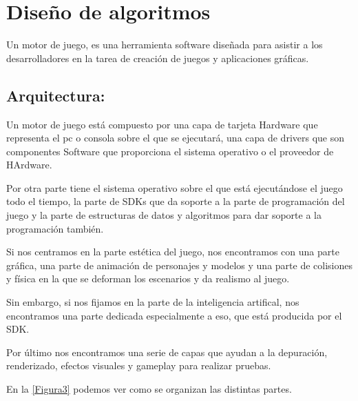 \chapter[Diseño de Algoritmos]{\label{identificadorReferenciaCruzada}
Diseño de algoritmos}


Un motor de juego, es una herramienta software diseñada para asistir a los desarrolladores en la tarea de creación de juegos y aplicaciones gráficas\cite{B9}.

\section{Arquitectura:}

Un motor de juego está compuesto por una capa de tarjeta Hardware que representa el pc o consola sobre el que se ejecutará, una capa de drivers que son componentes Software que proporciona el sistema operativo o el proveedor de HArdware.

Por otra parte tiene el sistema operativo sobre el que está ejecutándose el juego todo el tiempo, la parte de SDKs que da soporte a la parte de programación del juego y la parte de estructuras de datos y algoritmos para dar soporte a la programación también.

Si nos centramos en la parte estética del juego, nos encontramos con una parte gráfica, una parte de animación de personajes y modelos y una parte de colisiones y física en la que se deforman los escenarios y da realismo al juego.

Sin embargo, si nos fijamos en la parte de la inteligencia artifical, nos encontramos una parte dedicada especialmente a eso, que está producida por el SDK.

Por último nos encontramos una serie de capas que ayudan a la depuración, renderizado, efectos visuales y gameplay para realizar pruebas.

En la \ref{Figura3} podemos ver como se organizan las distintas partes.

